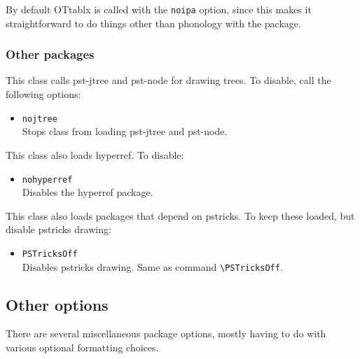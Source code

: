 \documentclass[11pt, tipa, color]{./lingdoc}
\newcommand{\Option}[1]{\texttt{#1}}
\newcommand{\Package}[1]{\textsf{{#1}}}
\begin{document}
    \noindent By default \Package{OTtablx} is called with the \Option{noipa} option, since this makes it straightforward to do things other than phonology with the package. 


  \subsubsection{Other packages}

    This class calls \Package{pst-jtree} and \Package{pst-node} for drawing trees. To disable, call the following options:

      \begin{itemize}[leftmargin=0em]
        \item \Option{nojtree} \\ 
          Stops class from loading \Package{pst-jtree} and \Package{pst-node}.
      \end{itemize}
      
    \noindent This class also loads \Package{hyperref}. To disable:
    
      \begin{itemize}[leftmargin=0em]
	  \item \Option{nohyperref} \\ Disables the \Package{hyperref} package.
      \end{itemize}

    \noindent This class also loads packages that depend on \Package{pstricks}. To keep these loaded, but disable \Package{pstricks} drawing:
    
      \begin{itemize}[leftmargin=0em]
        \item \Option{PSTricksOff} \\
	  Disables \Package{pstricks} drawing. Same as command \verb+\PSTricksOff+.
      \end{itemize}


  \subsection{Other options}\label{S:Other}
  
    There are several miscellaneous package options, mostly having to do with various optional formatting choices.
  
\end{document}
